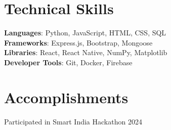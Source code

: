 \resumeSubHeadingListEnd



%
\section{Technical Skills}
\begin{itemize}[leftmargin=0.15in, label={}]
\small{\item{
\textbf{Languages}{: Python, JavaScript, HTML, CSS, SQL} \\
\textbf{Frameworks}{: Express.js, Bootstrap, Mongoose} \\
\textbf{Libraries}{: React, React Native, NumPy, Matplotlib} \\
\textbf{Developer Tools}{: Git, Docker, Firebase}
}}
\end{itemize}


\section{Accomplishments}
\begin{itemize}[leftmargin=0.15in, label={}]
\small{\item{
{Participated in Smart India Hackathon 2024} \\
}}
\end{itemize}


